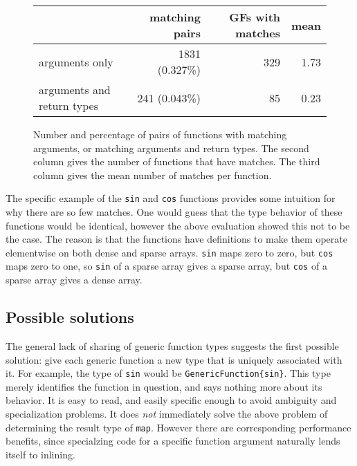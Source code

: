 \begin{figure}
  \begin{center}
    \begin{tabular}{|l|r|r|r|}\hline
    &  \textbf{matching pairs} & \textbf{GFs with matches} & \textbf{mean} \\
      \hline \hline
arguments only             & 1831 (0.327\%)  &   329       &          1.73 \\
\hline
arguments and return types &  241 (0.043\%)  &   85        &          0.23 \\
\hline
\end{tabular}
\end{center}
  \caption{
    Number and percentage of pairs of functions with matching arguments, or
    matching arguments and return types. The second column gives the number of
    functions that have matches. The third column gives the
    mean number of matches per function.
  }
  \label{fig:matchingfuncs}
\end{figure}

The specific example of the \texttt{sin} and \texttt{cos} functions provides
some intuition for why there are so few matches.
One would guess that the type behavior of these functions would be identical,
however the above evaluation showed this not to be the case.
The reason is that the functions have definitions to make them operate
elementwise on both dense and sparse arrays.
\texttt{sin} maps zero to zero, but \texttt{cos} maps zero to one,
so \texttt{sin} of a sparse array gives a sparse array, but
\texttt{cos} of a sparse array gives a dense array.


\subsection{Possible solutions}

The general lack of sharing of generic function types suggests the first
possible solution: give each generic function a new type that is uniquely
associated with it. For example, the type of \texttt{sin} would be
\texttt{GenericFunction\{sin\}}. This type merely identifies the function
in question, and says nothing more about its behavior. It is easy to read,
and easily specific enough to avoid ambiguity and specialization
problems. It does \emph{not} immediately solve the above problem of
determining the result type of \texttt{map}. However there are
corresponding performance benefits, since specialzing code for a
specific function argument naturally lends itself to inlining.

